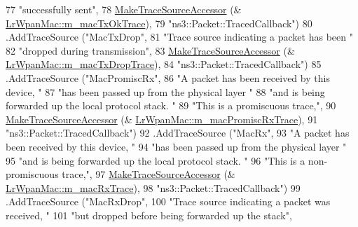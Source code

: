 \begin{DoxyCode}
77                      \textcolor{stringliteral}{"successfully sent"},
78                      \hyperlink{group__tracing_gab21a770b9855af4e8f69f7531ea4a6b0}{MakeTraceSourceAccessor} (&
      \hyperlink{classns3_1_1LrWpanMac_a0f0ba6655bd6aba1bac028bd25f4ab7a}{LrWpanMac::m\_macTxOkTrace}),
79                      \textcolor{stringliteral}{"ns3::Packet::TracedCallback"})
80     .AddTraceSource (\textcolor{stringliteral}{"MacTxDrop"},
81                      \textcolor{stringliteral}{"Trace source indicating a packet has been "}
82                      \textcolor{stringliteral}{"dropped during transmission"},
83                      \hyperlink{group__tracing_gab21a770b9855af4e8f69f7531ea4a6b0}{MakeTraceSourceAccessor} (&
      \hyperlink{classns3_1_1LrWpanMac_a3ff373bbe119ee781fda57327163b43a}{LrWpanMac::m\_macTxDropTrace}),
84                      \textcolor{stringliteral}{"ns3::Packet::TracedCallback"})
85     .AddTraceSource (\textcolor{stringliteral}{"MacPromiscRx"},
86                      \textcolor{stringliteral}{"A packet has been received by this device, "}
87                      \textcolor{stringliteral}{"has been passed up from the physical layer "}
88                      \textcolor{stringliteral}{"and is being forwarded up the local protocol stack.  "}
89                      \textcolor{stringliteral}{"This is a promiscuous trace,"},
90                      \hyperlink{group__tracing_gab21a770b9855af4e8f69f7531ea4a6b0}{MakeTraceSourceAccessor} (&
      \hyperlink{classns3_1_1LrWpanMac_af05f835a006d0fa06af15d1d504219a4}{LrWpanMac::m\_macPromiscRxTrace}),
91                      \textcolor{stringliteral}{"ns3::Packet::TracedCallback"})
92     .AddTraceSource (\textcolor{stringliteral}{"MacRx"},
93                      \textcolor{stringliteral}{"A packet has been received by this device, "}
94                      \textcolor{stringliteral}{"has been passed up from the physical layer "}
95                      \textcolor{stringliteral}{"and is being forwarded up the local protocol stack.  "}
96                      \textcolor{stringliteral}{"This is a non-promiscuous trace,"},
97                      \hyperlink{group__tracing_gab21a770b9855af4e8f69f7531ea4a6b0}{MakeTraceSourceAccessor} (&
      \hyperlink{classns3_1_1LrWpanMac_a38183ee976b61d2c93942250f5670b7c}{LrWpanMac::m\_macRxTrace}),
98                      \textcolor{stringliteral}{"ns3::Packet::TracedCallback"})
99     .AddTraceSource (\textcolor{stringliteral}{"MacRxDrop"},
100                      \textcolor{stringliteral}{"Trace source indicating a packet was received, "}
101                      \textcolor{stringliteral}{"but dropped before being forwarded up the stack"},

\end{DoxyCode}
